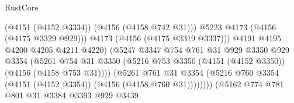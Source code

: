 \begin{lexlean}{RustCore}
\begin{coremodule}
                                                  (@4151 (@4152 @3334))
                                                  (@4156 (@4158 @742 @31)))
                                                @5223
                                                @4173
                                                (@4156 (@4175 @3329 @929)))
                                              @4173
                                              (@4156 (@4175 @3319 @3337)))
                                            @4191
                                            @4195
                                            @4200
                                            @4205
                                            @4211
                                            @4220)
                                          (@5247
                                            @3347
                                            @754
                                            @761
                                            @31
                                            @929
                                            @3350
                                            @929
                                            @3354
                                            (@5261
                                              @754
                                              @31
                                              @3350
                                              (@5216
                                                @753
                                                @3350
                                                (@4151 (@4152 @3350))
                                                (@4156 (@4158 @753 @31))))
                                            (@5261
                                              @761
                                              @31
                                              @3354
                                              (@5216
                                                @760
                                                @3354
                                                (@4151 (@4152 @3354))
                                                (@4156 (@4158 @760 @31))))))))
                                    (@5162
                                      @774
                                      @781
                                      @801
                                      @31
                                      @3384
                                      @3393
                                      @929
                                      @3439

\end{coremodule}
\end{lexlean}
